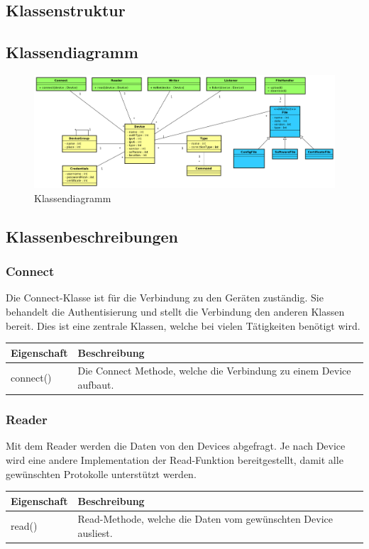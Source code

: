 \begin{landscape}
\section{Klassenstruktur}
\subsection{Klassendiagramm}
\begin{figure}[H]
\centering
\includegraphics[width=1\textwidth]{images/domainmodel.png}
\caption{Klassendiagramm}
\end{figure}
\end{landscape}
\subsection{Klassenbeschreibungen}
\subsubsection{Connect}
Die Connect-Klasse ist für die Verbindung zu den Geräten zuständig. Sie behandelt die Authentisierung und stellt die Verbindung den anderen Klassen bereit. Dies ist eine zentrale Klassen, welche bei vielen Tätigkeiten benötigt wird.
\begin{table}[H]
\centering
    \begin{tabular}{@{}l p{14.1cm} @{}}\toprule    
    {Eigenschaft} & {Beschreibung}\\ \midrule
    connect() & Die Connect Methode, welche die Verbindung zu einem Device aufbaut.\\
    \bottomrule
    \end{tabular}
\end{table}

\subsubsection{Reader}
Mit dem Reader werden die Daten von den Devices abgefragt. Je nach Device wird eine andere Implementation der Read-Funktion bereitgestellt, damit alle gewünschten Protokolle unterstützt werden.
\noindent \begin{table}[H]
\centering
    \begin{tabular}{@{}l p{14.1cm} @{}}\toprule    
    {Eigenschaft} & {Beschreibung}\\ \midrule      
    read() & Read-Methode, welche die Daten vom gewünschten Device ausliest.\\
    \bottomrule
    \end{tabular}
\end{table}

